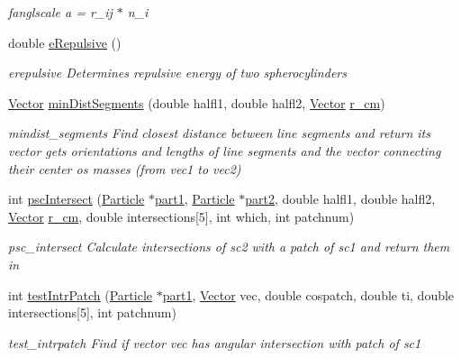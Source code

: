 \begin{DoxyCompactItemize}
\begin{DoxyCompactList}\small\item\em fanglscale a = r\+\_\+ij $\ast$ n\+\_\+i \end{DoxyCompactList}\item 
double \hyperlink{class_pair_energy_calculator_ab81b2889890df0b67b470b1db7601371}{e\+Repulsive} ()
\begin{DoxyCompactList}\small\item\em erepulsive Determines repulsive energy of two spherocylinders \end{DoxyCompactList}\item 
\hyperlink{class_vector}{Vector} \hyperlink{class_pair_energy_calculator_a564860504e20d5b72d7da38c30f4b5b6}{min\+Dist\+Segments} (double halfl1, double halfl2, \hyperlink{class_vector}{Vector} \hyperlink{class_pair_energy_calculator_aa927503ba2066bfcd0fb072e0b7e12cc}{r\+\_\+cm})
\begin{DoxyCompactList}\small\item\em mindist\+\_\+segments Find closest distance between line segments and return its vector gets orientations and lengths of line segments and the vector connecting their center os masses (from vec1 to vec2) \end{DoxyCompactList}\item 
int \hyperlink{class_pair_energy_calculator_aa6363c9c7b4f22fd64ccc387ce47907d}{psc\+Intersect} (\hyperlink{class_particle}{Particle} $\ast$\hyperlink{class_pair_energy_calculator_a168122b4b21b48d25093a9e314045929}{part1}, \hyperlink{class_particle}{Particle} $\ast$\hyperlink{class_pair_energy_calculator_a5930e66e7a0e9c3b2bd7e76391854ad2}{part2}, double halfl1, double halfl2, \hyperlink{class_vector}{Vector} \hyperlink{class_pair_energy_calculator_aa927503ba2066bfcd0fb072e0b7e12cc}{r\+\_\+cm}, double intersections\mbox{[}5\mbox{]}, int which, int patchnum)
\begin{DoxyCompactList}\small\item\em psc\+\_\+intersect Calculate intersections of sc2 with a patch of sc1 and return them in \end{DoxyCompactList}\item 
int \hyperlink{class_pair_energy_calculator_a4b8db09d4bfb3a9b66ae3ddf9b766fa0}{test\+Intr\+Patch} (\hyperlink{class_particle}{Particle} $\ast$\hyperlink{class_pair_energy_calculator_a168122b4b21b48d25093a9e314045929}{part1}, \hyperlink{class_vector}{Vector} vec, double cospatch, double ti, double intersections\mbox{[}5\mbox{]}, int patchnum)
\begin{DoxyCompactList}\small\item\em test\+\_\+intrpatch Find if vector vec has angular intersection with patch of sc1 \end{DoxyCompactList}\item 

\end{DoxyCompactItemize}
